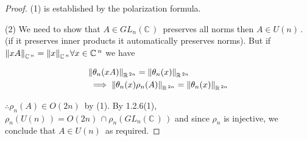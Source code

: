 \documentclass[12pt,a4paper]{article}
\newcommand{\rR}{\ensuremath{\mathbb{R}\,}}
\newcommand{\cC}{\ensuremath{\mathbb{C}\,}}
\newcommand{\glnc}{\ensuremath{GL_n(\cC)\,}}
\newcommand{\gun}{\ensuremath{U(n)\,}}
\newcommand{\gok}[1]{\ensuremath{O(#1)\,}}
\begin{document}
\begin{proof}
(1) is established by the polarization formula.

(2) We need to show that $A\in \glnc$ preserves all norms then $A\in \gun$. (if it preserves inner products it automatically preserves norms). But if $\norm{xA}_{\cC^{n}}=\norm{x}_{\cC^{n}} \forall x\in \cC^n$ we have

\begin{align*}
&\norm{\theta_n(xA)}_{\rR^{2n}}=\norm{\theta_n(x)}_{\rR^{2n}}\\
&\implies \norm{\theta_n(x)\rho_n(A)}_{\rR^{2n}}=\norm{\theta_n(x)}_{\rR^{2n}}\\
\end{align*}

$\therefore \rho_n (A)\in \gok{2n}$ by (1). By 1.2.6(1), $\rho_n(\gun)=\gok{2n}\cap \rho_n(\glnc)$ and since $\rho_n$ is injective, we conclude that $A\in \gun$ as required. 

\end{proof}
\end{document}
